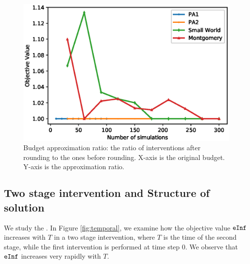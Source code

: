 \begin{figure}[!h]
    \centering
    \includegraphics[scale = 0.45]{Figuresnew/budgetviolation}
    \caption{Budget approximation ratio: the ratio of interventions after rounding to the ones before rounding. X-axis is the original budget. Y-axis is the approximation ratio.}
    \label{fig:budgetviolation}
\end{figure}

\subsection{Two stage intervention and Structure of solution}
We study the \probtwo{}. In Figure \ref{fig:temporal}, we examine how the objective value $\texttt{eInf}{}$ increases with $T$ in a two stage intervention, where $T$ is the time of the second stage, while the first intervention is performed at time step 0. We observe that $\texttt{eInf}{}$ increases very rapidly with $T$.

